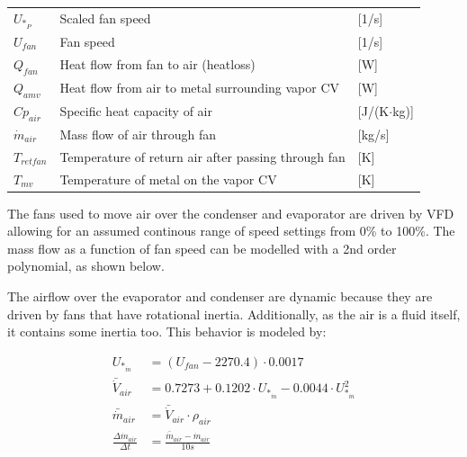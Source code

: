 \begin{center}
	\begin{tabular}{l p{10cm} l}
		$U_{*_P}$    & Scaled fan speed                                    & [1/\si{s}]                        \\
		$U_{fan}$       & Fan speed                                           & [1/\si{s}]                        \\
		$Q_{fan}$       & Heat flow from fan to air (heatloss)                & [\si{W}]                          \\
		$Q_{amv}$       & Heat flow from air to metal surrounding vapor CV    & [\si{W}]                          \\
		$Cp_{air}$      & Specific heat capacity of air                       & [\si{J}/(\si{K}$ \cdot $\si{kg})] \\
		$\dot{m}_{air}$ & Mass flow of air through fan                        & [\si{kg}/\si{s}]                  \\
		$T_{retfan}$    & Temperature of return air after passing through fan & [\si{K}]                          \\
		$T_{mv}$        & Temperature of metal on the vapor CV                & [\si{K}]
	\end{tabular}
\end{center}

The fans used to move air over the condenser and evaporator are driven by VFD allowing for an assumed continous range of speed settings from 0\% to 100\%. The mass flow as a function of fan speed can be modelled with a 2nd order polynomial, as shown below.

The airflow over the evaporator and condenser are dynamic because they are driven by fans that have rotational inertia. Additionally, as the air is a fluid itself, it contains some inertia too. This behavior is modeled by:

\begin{align}
	U_{*_{\dot{m}}} & = (U_{fan} - 2270.4)\cdot 0.0017 \\
	\bar{\dot{V}}_{air} & = 0.7273 + 0.1202 \cdot 	U_{*_{\dot{m}}}  -0.0044 \cdot 	U_{*_{\dot{m}}}^2\\
	\bar{\dot{m}}_{air} & = \bar{\dot{V}}_{air} \cdot \rho_{air}  \label{eq:Evaporator_FanAirInstantMassFlow}\\
	\frac{\Delta \dot{m}_{air}}{\Delta t} & = \frac{\bar{\dot{m}}_{air}  - \dot{m}_{air}} {10s} \label{eq:Evaporator_FanAirRateOfChange}
\end{align}

